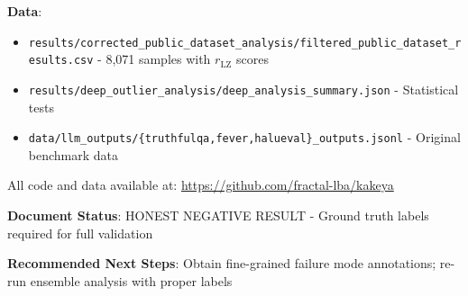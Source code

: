 \documentclass[11pt]{article}
\begin{document}
\textbf{Data}:
\begin{itemize}
\item \texttt{results/corrected\_public\_dataset\_analysis/filtered\_public\_dataset\_results.csv} - 8,071 samples with $r_{\text{LZ}}$ scores
\item \texttt{results/deep\_outlier\_analysis/deep\_analysis\_summary.json} - Statistical tests
\item \texttt{data/llm\_outputs/\{truthfulqa,fever,halueval\}\_outputs.jsonl} - Original benchmark data
\end{itemize}

All code and data available at: \url{https://github.com/fractal-lba/kakeya}

\textbf{Document Status}: HONEST NEGATIVE RESULT - Ground truth labels required for full validation

\textbf{Recommended Next Steps}: Obtain fine-grained failure mode annotations; re-run ensemble analysis with proper labels
\end{document}
